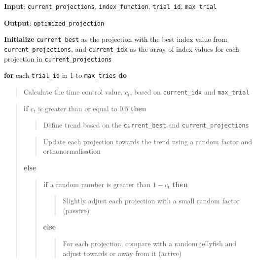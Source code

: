 \documentclass[
  12pt,
]{interact}
\theoremstyle{plain}
\begin{document}
\begin{tcolorbox}[enhanced jigsaw, toprule=.15mm, bottomtitle=1mm, titlerule=0mm, leftrule=.75mm, opacitybacktitle=0.6, colback=white, breakable, toptitle=1mm, coltitle=black, colbacktitle=quarto-callout-note-color!10!white, title={Algorithm: Jellyfish Optimizer Pseudo Code}, arc=.35mm, bottomrule=.15mm, opacityback=0, left=2mm, rightrule=.15mm, colframe=quarto-callout-note-color-frame]

\textbf{Input}: \texttt{current\_projections}, \texttt{index\_function},
\texttt{trial\_id}, \texttt{max\_trial}

\textbf{Output}: \texttt{optimized\_projection}

\textbf{Initialize} \texttt{current\_best} as the projection with the
best index value from \texttt{current\_projections}, and
\texttt{current\_idx} as the array of index values for each projection
in \texttt{current\_projections}

\textbf{for} each \texttt{trial\_id} in 1 to \texttt{max\_tries}
\textbf{do}

\begin{quote}
Calculate the time control value, \(c_t\), based on
\texttt{current\_idx} and \texttt{max\_trial}
\end{quote}

\begin{quote}
\textbf{if} \(c_t\) is greater than or equal to \(0.5\) \textbf{then}

\begin{quote}
Define trend based on the \texttt{current\_best} and
\texttt{current\_projections}
\end{quote}

\begin{quote}
Update each projection towards the trend using a random factor and
orthonormalisation
\end{quote}

\textbf{else}

\begin{quote}
\textbf{if} a random number is greater than \(1 - c_t\) \textbf{then}

\begin{quote}
Slightly adjust each projection with a small random factor (passive)
\end{quote}

\textbf{else}

\begin{quote}
For each projection, compare with a random jellyfish and adjust towards
or away from it (active)
\end{quote}
\end{quote}


\end{quote}
\end{tcolorbox}
\end{document}
